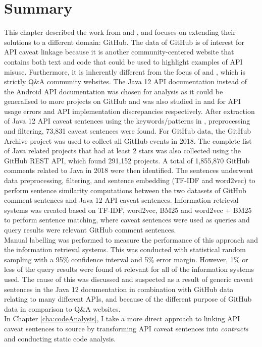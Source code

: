 \section{Summary}
\label{sec:info-summary}
This chapter described the work from \cite{jiamou} and \cite{xiaoxue}, and focuses on extending their solutions to a different domain: GitHub. The data of GitHub is of interest for API caveat linkage because it is another community-centered website that contains both text and code that could be used to highlight examples of API misuse. Furthermore, it is inherently different from the focus of \cite{jiamou} and \cite{xiaoxue}, which is strictly Q\&A community websites. The Java 12 API documentation instead of the Android API documentation was chosen for analysis as it could be generalised to more projects on GitHub and was also studied in \cite{code-examples} and \cite{zhou-directive} for API usage errors and API implementation discrepancies respectively. After extraction of Java 12 API caveat sentences using the keywords/patterns in \cite{caveat-knowledge-graph}, preprocessing and filtering, 73,831 caveat sentences were found. For GitHub data, the GitHub Archive project was used to collect all GitHub events in 2018. The complete list of Java related projects that had at least 2 stars was also collected using the GitHub REST API, which found 291,152 projects. A total of 1,855,870 GitHub comments related to Java in 2018 were then identified. The sentences underwent data preprocessing, filtering, and sentence embedding (TF-IDF and word2vec) to perform sentence similarity computations between the two datasets of GitHub comment sentences and Java 12 API caveat sentences. Information retrieval systems was created based on TF-IDF, word2vec, BM25 and word2vec + BM25 to perform sentence matching, where caveat sentences were used as queries and query results were relevant GitHub comment sentences. \\
Manual labelling was performed to measure the performance of this approach and the information retrieval systems. This was conducted with statistical random sampling with a 95\% confidence interval and 5\% error margin. However, 1\% or less of the query results were found ot relevant for all of the information systems used. The cause of this was discussed and suspected as a result of generic caveat sentences in the Java 12 documentation in combination with GitHub data relating to many different APIs, and because of the different purpose of GitHub data in comparison to Q\&A websites.\\
In Chapter \ref{cha:codeAnalysis}, I take a more direct approach to linking API caveat sentences to source by transforming API caveat sentences into \textit{contracts} and conducting static code analysis.
